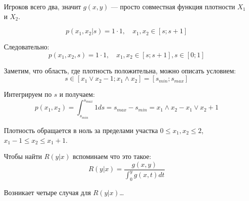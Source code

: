 \begin{enumerate}


Игроков всего два, значит $ g(x,y) $ --- просто совместная функция плотности $ X_{1} $ и $ X_{2} $.

\begin{equation}
p(x_{1},x_{2}|s)=1\cdot 1, \quad x_{1},x_{2}\in [s;s+1]
\end{equation}

Следовательно:
\begin{equation}
p(x_{1},x_{2},s)=1\cdot 1, \quad x_{1},x_{2}\in [s;s+1], s\in [0;1]
\end{equation}

Заметим, что область, где плотность положительна, можно описать условием:
\begin{equation}
s\in [x_{1}\vee x_{2}-1; x_{1}\wedge x_{2}]=[s_{min};s_{max}]
\end{equation}

Интегрируем по $ s $ и получаем:
\begin{equation}
p(x_{1},x_{2})=\int_{s_{min}}^{s_{max}} 1 ds= s_{max}-s_{min}=x_{1}\wedge x_{2}-x_{1}\vee x_{2}+1
\end{equation}

Плотность обращается в ноль за пределами участка $ 0\leq x_{1},x_{2}\leq 2 $, $ x_{1}-1\leq x_{2} \leq x_{1}+1 $.

Чтобы найти $ R(y|x) $ вспоминаем что это такое:
\begin{equation}
R(y|x)=\frac{g(x,y)}{\int_{0}^{y}g(x,t)dt}
\end{equation}

Возникает четыре случая для $ R(y|x) $\ldots  



\end{enumerate}
